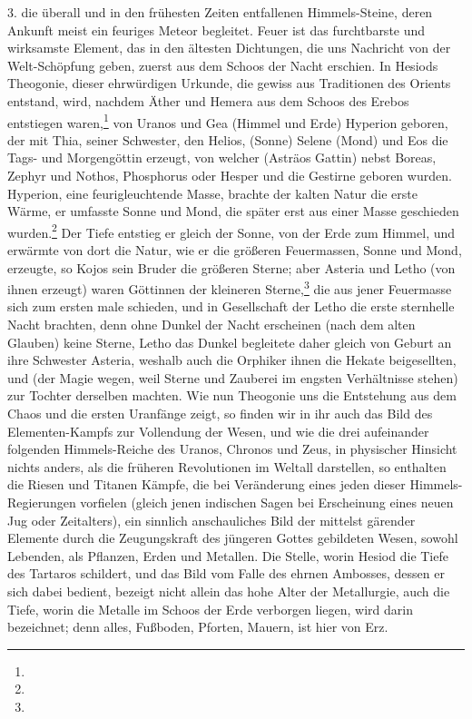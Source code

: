 \documentclass[a4paper, 11pt, oneside, polutonikogreek, german]{article}
\begin{document}
3. die überall und in den frühesten Zeiten entfallenen Himmels-Steine, deren Ankunft meist ein feuriges Meteor begleitet. Feuer ist das furchtbarste und wirksamste Element, das in den ältesten Dichtungen, die uns Nachricht von der Welt-Schöpfung geben, zuerst aus dem Schoos der Nacht erschien. In Hesiods Theogonie, dieser ehrwürdigen Urkunde, die gewiss aus Traditionen des Orients entstand, wird, nachdem Äther und Hemera aus dem Schoos des Erebos entstiegen waren,\footnote{} von Uranos und Gea (Himmel und Erde) Hyperion geboren, der mit Thia, seiner Schwester, den Helios, (Sonne) Selene (Mond) und Eos die Tags- und Morgengöttin erzeugt, von welcher (Asträos Gattin) nebst Boreas, Zephyr und Nothos, Phosphorus oder Hesper und die Gestirne geboren wurden. Hyperion, eine feurigleuchtende Masse, brachte der kalten Natur die erste Wärme, er umfasste Sonne und Mond, die später erst aus einer Masse geschieden wurden.\footnote{} Der Tiefe entstieg er gleich der Sonne, von der Erde zum Himmel, und erwärmte von dort die Natur, wie er die größeren Feuermassen, Sonne und Mond, erzeugte, so Kojos sein Bruder die größeren Sterne; aber Asteria und Letho (von ihnen erzeugt) waren Göttinnen der kleineren Sterne,\footnote{} die aus jener Feuermasse sich zum ersten male schieden, und in Gesellschaft der Letho die erste sternhelle Nacht brachten, denn ohne Dunkel der Nacht erscheinen (nach dem alten Glauben) keine Sterne, Letho das Dunkel begleitete daher gleich von Geburt an ihre Schwester Asteria, weshalb auch die Orphiker ihnen die Hekate beigesellten, und (der Magie wegen, weil Sterne und Zauberei im engsten Verhältnisse stehen) zur Tochter derselben machten. Wie nun Theogonie uns die Entstehung aus dem Chaos und die ersten Uranfänge zeigt, so finden wir in ihr auch das Bild des Elementen-Kampfs zur Vollendung der Wesen, und wie die drei aufeinander folgenden Himmels-Reiche des Uranos, Chronos und Zeus, in physischer Hinsicht nichts anders, als die früheren Revolutionen im Weltall darstellen, so enthalten die Riesen und Titanen Kämpfe, die bei Veränderung eines jeden dieser Himmels-Regierungen vorfielen (gleich jenen indischen Sagen bei Erscheinung eines neuen Jug oder Zeitalters), ein sinnlich anschauliches Bild der mittelst gärender Elemente durch die Zeugungskraft des jüngeren Gottes gebildeten Wesen, sowohl Lebenden, als Pflanzen, Erden und Metallen. Die Stelle, worin Hesiod die Tiefe des Tartaros schildert, und das Bild vom Falle des ehrnen Ambosses, dessen er sich dabei bedient, bezeigt nicht allein das hohe Alter der Metallurgie, auch die Tiefe, worin die Metalle im Schoos der Erde verborgen liegen, wird darin bezeichnet; denn alles, Fußboden, Pforten, Mauern, ist hier von Erz.
\end{document}
